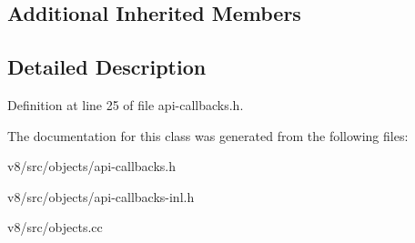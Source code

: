 \subsection*{Additional Inherited Members}


\subsection{Detailed Description}


Definition at line 25 of file api-\/callbacks.\+h.



The documentation for this class was generated from the following files\+:\begin{DoxyCompactItemize}
\item 
v8/src/objects/api-\/callbacks.\+h\item 
v8/src/objects/api-\/callbacks-\/inl.\+h\item 
v8/src/objects.\+cc\end{DoxyCompactItemize}
